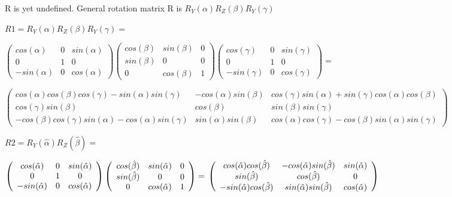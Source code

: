 \documentclass[12pt]{article}
\begin{document}
\begin{list}{()~}{}
\item 
R is yet undefined. General rotation matrix R is $R_Y(\alpha)R_Z(\beta)R_Y(\gamma)$ 
\item
$R1 = R_Y(\alpha)R_Z(\beta)R_Y(\gamma) =$

$\left( \begin{array}{ccc}
cos(\alpha) & 0 & sin(\alpha) \\
0 & 1  & 0 \\
- sin(\alpha) & 0 & cos(\alpha) \end{array} \right)
\left( \begin{array}{ccc}
cos(\beta)  &  sin(\beta) & 0 \\
sin(\beta)  &  0 & 0\\
0& cos(\beta) & 1 \end{array} \right)
\left( \begin{array}{ccc}
cos(\gamma) & 0 & sin(\gamma) \\
0 & 1  & 0 \\
- sin(\gamma) & 0 & cos(\gamma) \end{array} \right) = $

$\left( \begin{array}{ccc}
cos(\alpha) cos(\beta) cos(\gamma) - sin(\alpha) sin(\gamma) & - cos(\alpha) sin(\beta) & cos(\gamma) sin(\alpha) + sin(\gamma) cos(\alpha) cos(\beta) \\
cos(\gamma) sin(\beta) & cos(\beta) & sin(\beta) sin(\gamma) \\
- cos(\beta) cos(\gamma) sin(\alpha) - cos(\alpha) sin(\gamma) & sin(\alpha) sin(\beta) & cos(\alpha) cos(\gamma) - cos(\beta) sin(\alpha) sin(\gamma) \end{array} \right)$

$R2 = R_Y(\hat{\alpha})R_Z(\hat{\beta}) =$

$\left( \begin{array}{ccc}
cos(\hat{\alpha})  & 0 & sin(\hat{\alpha}) \\
0 & 1  & 0 \\
- sin(\hat{\alpha}) & 0 & cos(\hat{\alpha})\end{array} \right)
\left( \begin{array}{ccc}
cos(\hat{\beta})  &  sin(\hat{\alpha}) & 0 \\
sin(\hat{\beta})  &  0 & 0\\
0& cos(\hat{\alpha}) & 1 \end{array} \right) = \\
\left( \begin{array}{ccc}
cos(\hat{\alpha}) cos(\hat{\beta}) & - cos(\hat{\alpha}) sin(\hat{\beta})  & sin(\hat{\alpha}) \\
sin(\hat{\beta}) & cos(\hat{\beta}) & 0 \\
- sin(\hat{\alpha}) cos(\hat{\beta}) & sin(\hat{\alpha}) sin(\hat{\beta}) & cos(\hat{\alpha}) \end{array} \right)$


\end{list}
\end{document}
